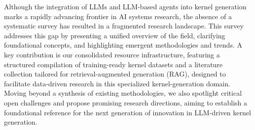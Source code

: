 Although the integration of LLMs and LLM-based agents into kernel generation marks a rapidly advancing frontier in AI systems research, the absence of a systematic survey has resulted in a fragmented research landscape. This survey addresses this gap by presenting a unified overview of the field, clarifying foundational concepts, and highlighting emergent methodologies and trends. A key contribution is our consolidated resource infrastructure, featuring a structured compilation of training-ready kernel datasets and a literature collection tailored for retrieval-augmented generation (RAG), designed to facilitate data-driven research in this specialized kernel-generation domain. Moving beyond a synthesis of existing methodologies, we also spotlight critical open challenges and propose promising research directions, aiming to establish a foundational reference for the next generation of innovation in LLM-driven kernel generation.


